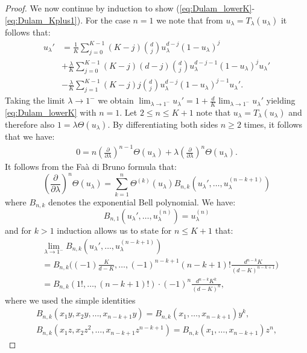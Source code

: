 \documentclass[12pt]{report}
\begin{document}
\begin{proof}
We now continue by induction to show (\ref{eq:Dulam_lowerK}-\ref{eq:Dulam_Kplus1}). For the case $n=1$ we note that from $u_{\lambda}=T_\lambda(u_{\lambda})$ it follows that:
\begin{align}
u_{\lambda}' &= 
\frac{1}{K} \sum_{j=0}^{K-1} (K-j) \binom{d}{j} u_\lambda ^{d-j} (1-u_\lambda)^j\\
&+ \frac{\lambda}{K} \sum_{j=0}^{K-1} (K-j) (d-j) \binom{d}{j} u_\lambda^{d-j-1} (1-u_\lambda)^j u_\lambda' \nonumber\\
& -\frac{\lambda}{K} \sum_{j=1}^{K-1} (K-j) j \binom{d}{j} u_\lambda^{d-j} (1-u_\lambda)^{j-1} u_\lambda'. \label{eq:Dulam_LLdk}
\end{align}
Taking the limit $\lambda \rightarrow  1^-$ we obtain $\lim_{\lambda \rightarrow 1^-} u_{\lambda}' = 1 + \frac{d}{K} \lim_{\lambda \rightarrow 1^-} u_{\lambda}'$ yielding \eqref{eq:Dulam_lowerK} with $n=1$. Let $2 \leq n \leq K+1$ note that $u_\lambda= T_\lambda(u_\lambda)$ and therefore also $1=\lambda \Theta(u_\lambda)$. By differentiating both sides $n\geq 2$ times, it follows that we have:
\begin{align}\label{eq:1=lamTheta}
0= n \left( \frac{\partial}{\partial \lambda} \right)^{n-1} \Theta(u_\lambda) + \lambda \left( \frac{\partial}{\partial \lambda} \right)^{n} \Theta(u_\lambda).
\end{align}
It follows from the Fa\`a di Bruno formula that:
\begin{equation}\label{eq:bruno}
\left(\frac{\partial}{\partial \lambda}\right)^n \Theta (u_\lambda)
=
\sum_{k=1}^n \Theta^{(k)}(u_\lambda) B_{n,k}(u_\lambda',\dots, u_{\lambda}^{(n-k+1)})
\end{equation}
where $B_{n,k}$ denotes the exponential Bell polynomial. We have:
$$
B_{n,1}(u_\lambda',\dots,u_\lambda^{(n)})=u_\lambda^{(n)}
$$
and for $k >1$ induction allows us to state for $n \leq K+1$ that:
\begin{align*}
&\lim_{\lambda \rightarrow 1^-} B_{n,k}(u_\lambda',\dots,u_{\lambda}^{(n-k+1)})\\
&=
B_{n,k}\big( (-1) \frac{K}{d-K}, \ldots, (-1)^{n-k+1} (n-k+1)! \frac{d^{n-k} K}{(d-K)^{n-k+1}} \big)\\
&= B_{n,k}(1!,\dots,(n-k+1)!) \cdot (-1)^n \frac{d^{n-k} K^k}{(d-K)^n},
\end{align*}
where we used the simple identities
\begin{align*}
B_{n,k}(x_1y, x_2y, \ldots,x_{n-k+1}y) = B_{n,k}(x_1,\ldots,x_{n-k+1}) y^k, \\
B_{n,k}(x_1z, x_2z^2, \ldots,x_{n-k+1}z^{n-k+1}) = B_{n,k}(x_1,\ldots,x_{n-k+1}) z^n,

\end{align*}
\end{proof}
\end{document}
